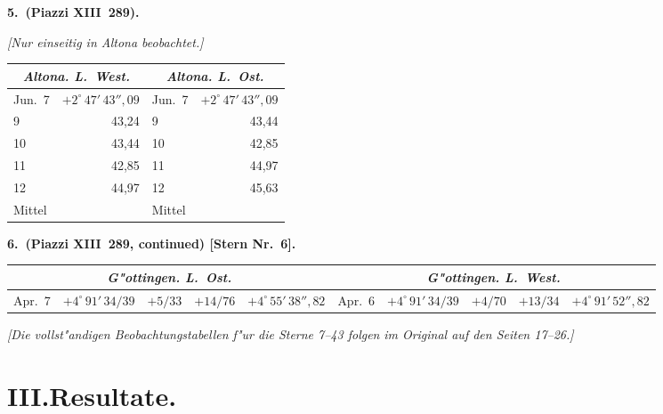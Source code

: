 \documentclass[12pt,a4paper]{article}
\theoremstyle{plain}
\theoremstyle{definition}
\theoremstyle{remark}
\begin{document}
\vspace{0.5cm}
\begin{small}
\noindent
\textbf{5.~(Piazzi XIII~289).}

\medskip
\textit{[Nur einseitig in Altona beobachtet.]}

\begin{tabular}{@{}l|r@{\quad}|@{\quad}l|r@{}}
\multicolumn{2}{c|}{\textit{Altona. L.~West.}} &
\multicolumn{2}{c}{\textit{Altona. L.~Ost.}}\\
\hline
\rule{0pt}{1em}Jun.~7 & $+2^\circ\,47'\,43''{,}09$ &
Jun.~7 & $+2^\circ\,47'\,43''{,}09$ \\
\phantom{Jun.~}9 & 43,24 &
\phantom{Jun.~}9 & 43,44 \\
10 & 43,44 &
10 & 42,85 \\
11 & 42,85 &
11 & 44,97 \\
12 & 44,97 &
12 & 45,63 \\
\hline
\multicolumn{2}{l|}{Mittel} &
\multicolumn{2}{l}{Mittel}\\
\end{tabular}
\end{small}

\vspace{0.5cm}
\begin{small}
\noindent
\textbf{6.~(Piazzi XIII~289, continued) [Stern Nr.~6].}

\medskip
\begin{tabular}{@{}l|r|r|r|r@{\quad}|@{\quad}l|r|r|r|r@{}}
\multicolumn{5}{c|}{\textit{G"ottingen. L.~Ost.}} &
\multicolumn{5}{c}{\textit{G"ottingen. L.~West.}}\\
\hline
\rule{0pt}{1em}Apr.~7 & $+4^\circ\,91'\,34/39$ & $+5/33$ & $+14/76$ & $+4^\circ\,55'\,38''{,}82$ &
Apr.~6 & $+4^\circ\,91'\,34/39$ & $+4/70$ & $+13/34$ & $+4^\circ\,91'\,52''{,}82$ \\
\end{tabular}
\end{small}

\vspace{0.5cm}
\begin{center}
\textit{[Die vollst"andigen Beobachtungstabellen f"ur die Sterne 7--43 folgen}
\textit{im Original auf den Seiten 17--26.]}
\end{center}

\newpage

\section*{III.\quad Resultate.}
\end{document}
